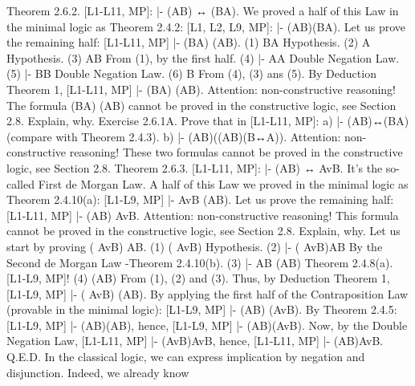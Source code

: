 Theorem 2.6.2. [L1-L11, MP]: |- (A\IMPLIES B) ↔ (\neg B\IMPLIES \neg A).
We proved a half of this Law in the minimal logic as Theorem 2.4.2: [L1, L2, L9, MP]: |-
(A\IMPLIES B)\IMPLIES (\neg B\IMPLIES \neg A). Let us prove the remaining half: [L1-L11, MP] |- (\neg B\IMPLIES \neg A) \IMPLIES  (A\IMPLIES B).
(1) \neg B\IMPLIES \neg A Hypothesis.
(2) A Hypothesis.
(3) \neg \neg A\IMPLIES \neg \neg B From (1), by the first half.
(4) |- A\IMPLIES \neg \neg A Double Negation Law.
(5) |- \neg \neg B\IMPLIES B Double Negation Law.
(6) B From (4), (3) ans (5).
By Deduction Theorem 1, [L1-L11, MP] |- (\neg B\IMPLIES \neg A) \IMPLIES  (A\IMPLIES B).
Attention: non-constructive reasoning! The formula (\neg B\IMPLIES \neg A) \IMPLIES  (A\IMPLIES B) cannot be proved in the
constructive logic, see Section 2.8. Explain, why.
Exercise 2.6.1A. Prove that in [L1-L11, MP]:
a) |- (\neg A\IMPLIES B)↔(\neg B\IMPLIES A) (compare with Theorem 2.4.3).
b) |- (A\IMPLIES B)\IMPLIES ((\neg A\IMPLIES \neg B)\IMPLIES (B↔A)).
Attention: non-constructive reasoning! These two formulas cannot be proved in the constructive logic,
see Section 2.8.
Theorem 2.6.3. [L1-L11, MP]: |- \neg (A\AND B) ↔ \neg Av\neg B. It's the so-called First de Morgan Law.
A half of this Law we proved in the minimal logic as Theorem 2.4.10(a): [L1-L9, MP] |- \neg Av\neg B \IMPLIES 
\neg (A\AND B). Let us prove the remaining half: [L1-L11, MP] |- \neg (A\AND B) \IMPLIES  \neg Av\neg B.
Attention: non-constructive reasoning! This formula cannot be proved in the constructive logic, see
Section 2.8. Explain, why.
Let us start by proving \neg ( \neg Av\neg B) \IMPLIES  A\AND B.
(1) \neg ( \neg Av\neg B) Hypothesis.
(2) |- \neg ( \neg Av\neg B)\IMPLIES \neg \neg A\AND \neg \neg B By the Second de Morgan Law -Theorem
                                 2.4.10(b).
(3) |- \neg \neg A\AND \neg \neg B \IMPLIES  \neg \neg (A\AND B) Theorem 2.4.8(a). [L1-L9, MP]!
(4) \neg \neg (A\AND B) From (1), (2) and (3).
Thus, by Deduction Theorem 1, [L1-L9, MP] |- \neg ( \neg Av\neg B) \IMPLIES  \neg \neg (A\AND B). By applying the first half of the
Contraposition Law (provable in the minimal logic): [L1-L9, MP] |- \neg \neg \neg (A\AND B) \IMPLIES \neg  \neg (\neg Av\neg B). By
Theorem 2.4.5: [L1-L9, MP] |- \neg (A\AND B)\IMPLIES \neg \neg \neg (A\AND B), hence, [L1-L9, MP] |- \neg (A\AND B)\IMPLIES \neg  \neg (\neg Av\neg B).
Now, by the Double Negation Law, [L1-L11, MP] |- \neg \neg (\neg Av\neg B)\IMPLIES \neg Av\neg B, hence, [L1-L11, MP] |-
\neg (A\AND B)\IMPLIES \neg Av\neg B. Q.E.D.
In the classical logic, we can express implication by negation and disjunction. Indeed, we already know
